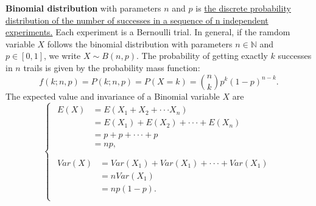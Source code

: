 \documentclass[10pt,onecolumn]{book}
\begin{document}
\textbf{Binomial distribution} with parameters $n$ and $p$ is \uline{the discrete probability distribution of the number of successes in a sequence of n independent experiments.} Each experiment is a Bernoulli trial. In general, if the ramdom variable $X$ follows the binomial distribution with parameters $n \in \mathbb{N}$ and $p \in [0, 1]$, we write $X \sim B(n, p)$. The probability of getting exactly $k$ successes in $n$ trails is given by the probability mass function:
\begin{equation}
f(k; n, p) = P(k; n, p) = P(X = k) = \binom{n}{k} p^k (1-p)^{n-k}.
\end{equation}
The expected value and invariance of a Binomial variable $X$ are
\begin{equation}\label{eq:binomial_distribution_e_var}
\left\{
	\begin{array}{lr}
	\begin{split}
	E(X)  & = E(X_{1} + X_{2} + \cdot \cdot \cdot X_{n}) \\
		  & = E(X_{1}) + E(X_{2}) + \cdot \cdot \cdot + E(X_{n}) \\
		  & = p + p + \cdot \cdot \cdot + p \\
		  & = np, \\
	\end{split} \\
	\begin{split}
	Var(X) & = Var(X_{1}) + Var(X_{1}) + \cdot \cdot \cdot + Var(X_{1}) \\
		   & = nVar(X_{1}) \\
		   & = np(1-p). \\
	\end{split} 
	\end{array}
\right.
\end{equation}
{\color{red}{There exists another solution directly through derivation of the probability mass function of Binomial distribution.}}
\end{document}
